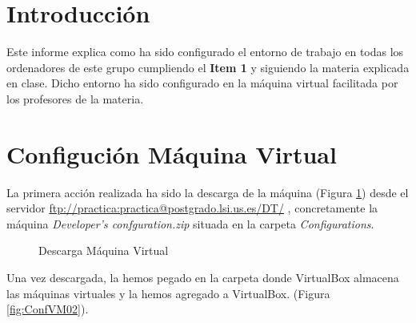 \documentclass{scrartcl}
\begin{document}




\section{Introducción}
Este informe explica como ha sido configurado el entorno de trabajo en todas los ordenadores de este grupo cumpliendo el \textbf{Item 1} y siguiendo la materia explicada en clase. Dicho entorno ha sido configurado en la máquina virtual facilitada por los profesores de la materia.
\section{Configución Máquina Virtual}
La primera acción realizada ha sido la descarga de la máquina  (Figura \ref{fig:ConfVM01}) desde el servidor \href{ftp://practica:practica@postgrado.lsi.us.es/DT/}{ftp://practica:practica@postgrado.lsi.us.es/DT/} , concretamente la máquina \textit{Developer's confguration.zip}  situada en la carpeta  \textit{Configurations}.

\begin{figure}[H]
	
	\centering
	\caption{Descarga Máquina Virtual}
	\label{fig:ConfVM01}
	
\end{figure}

Una vez descargada, la hemos pegado en la carpeta donde VirtualBox almacena las máquinas virtuales y la hemos agregado a VirtualBox. (Figura \ref{fig:ConfVM02}).
\end{document}
